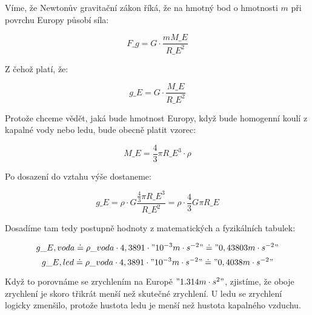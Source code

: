 \documentclass{fkssolpub}
\author{Ondřej Sedláček}
\begin{document}
Víme, že Newtonův gravitační zákon říká, že na hmotný bod o hmotnosti $m$ při povrchu Europy působí síla:

\[
	F\_{g} = G \cdot \frac{m M\_{E}}{R\_{E}^2}
\]

Z čehož platí, že:

\[
	g\_{E} = G \cdot \frac{M\_{E}}{R\_{E}^2}
\]

Protože chceme vědět, jaká bude hmotnost Europy, když bude homogenní koulí z kapalné vody nebo ledu, bude obecně platit vzorec:

\[
	M\_{E} = \frac{4}{3} \pi R\_{E}^3 \cdot \rho
\]

Po dosazení do vztahu výše dostaneme:

\[
	g\_{E} = \rho \cdot G \frac{\frac{4}{3} \pi R\_{E}^3}{R\_{E}^2} = \rho \cdot \frac{4}{3} G \pi R\_{E}
\]

Dosadíme tam tedy postupně hodnoty z matematických a fyzikálních tabulek:

\[
	g\_{E, voda} \doteq \rho\_{voda} \cdot 4,3891 \cdot "10^{-3} m \cdot s^{-2}" \doteq "0,43803 m \cdot s^{-2}"
\]
\[
	g\_{E, led} \doteq \rho\_{voda} \cdot 4,3891 \cdot "10^{-3} m \cdot s^{-2}" \doteq "0,4038 m \cdot s^{-2}"
\]

Když to porovnáme se zrychlením na Europě $"1.314 m \cdot s^2"$, zjistíme, že oboje zrychlení je skoro třikrát menší než skutečné zrychlení. U ledu se zrychlení logicky zmenšilo, protože hustota ledu je menší než hustota kapalného vzduchu.
\end{document}
